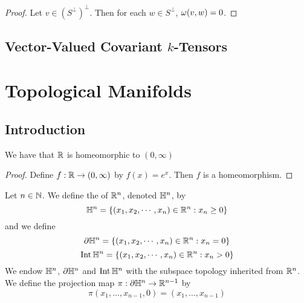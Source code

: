 \documentclass{book}
\begin{document}
	\begin{proof}
		Let $v \in (S^{\perp})^{\perp}$. Then for each $w \in S^{\perp}$, $\omega(v, w) = 0$. 
	\end{proof}
	
	
	
	
	\newpage
	\section{Vector-Valued Covariant $k$-Tensors}	
	
	
	
	
	
	
	
	
	
	
	
	
	
	
	
	
	
	
	
	
	
	
	
	
	
	
	
	
	
	
	

	\newpage
	
	\chapter{Topological Manifolds}
	
	\section{Introduction}
	
	\begin{ex}
		We have that $\mathbb{R}$ is homeomorphic to $(0, \infty)$
	\end{ex}

	\begin{proof}
		Define $f: \mathbb{R} \rightarrow (0,\infty)$ by $f(x) = e^x$. Then $f$ is a homeomorphism.
	\end{proof}
	
	\begin{defn}
		Let $n \in \mathbb{N}$. We define the  of $\mathbb{R}^n$, denoted $\mathbb{H}^n$, by $$\mathbb{H}^n = \{(x_1, x_2, \cdots, x_n) \in \mathbb{R}^n: x_n \geq 0\}$$ and we define $$\partial\mathbb{H}^n = \{(x_1, x_2, \cdots, x_n) \in \mathbb{R}^n: x_n = 0\}$$ 
		$$\operatorname{Int} \mathbb{H}^n = \{(x_1, x_2, \cdots, x_n) \in \mathbb{R}^n: x_n > 0\}$$
		We endow $\mathbb{H}^n$, $\partial \mathbb{H}^n$ and $\operatorname{Int} \mathbb{H}^n $ with the subspace topology inherited from $\mathbb{R}^n$.\\
		We define the projection map $\pi: \partial \mathbb{H}^n \rightarrow \mathbb{R}^{n-1}$ by 
		$$\pi(x_1, \ldots, x_{n-1}, 0) = (x_1, \ldots, x_{n-1})$$
	\end{defn}
\end{document}

